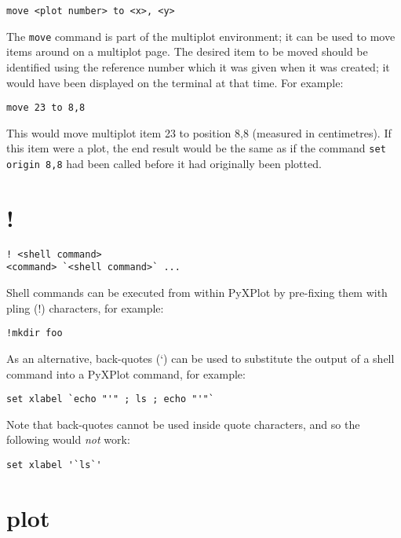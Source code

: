 \documentclass[a4paper,onecolumn,11pt]{book}
\begin{document}
\begin{verbatim}
move <plot number> to <x>, <y>
\end{verbatim}

The {\tt move} command is part of the multiplot environment; it can be used to
move items around on a multiplot page. The desired item to be moved should be
identified using the reference number which it was given when it was created;
it would have been displayed on the terminal at that time. For example:

\begin{verbatim}
move 23 to 8,8
\end{verbatim}
  
\noindent This would move multiplot item 23 to position 8,8 (measured in
centimetres). If this item were a plot, the end result would be the same as if
the command {\tt set origin 8,8} had been called before it had originally been
plotted.

\section{!}

\begin{verbatim}
! <shell command>
<command> `<shell command>` ...
\end{verbatim}

Shell commands can be executed from within PyXPlot by pre-fixing them with
pling (!) characters, for example:

\begin{verbatim}
!mkdir foo
\end{verbatim}

\noindent As an alternative, back-quotes (`) can be used to substitute the
output of a shell command into a PyXPlot command, for example:

\begin{verbatim}
set xlabel `echo "'" ; ls ; echo "'"`
\end{verbatim}

\noindent Note that back-quotes cannot be used inside quote characters, and so
the following would \textit{not} work:

\begin{verbatim}
set xlabel '`ls`'
\end{verbatim}


\section{plot}
\end{document}
